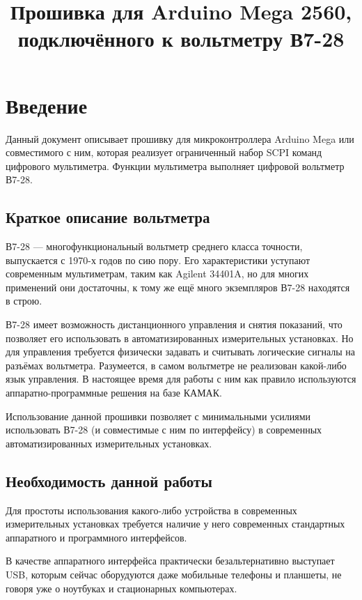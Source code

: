 \documentclass[12pt, a4paper]{article}
\title{Прошивка для Arduino Mega 2560, подключённого к вольтметру В7-28}
\newcommand{\SCPI}{\mbox{SCPI}}
\newcommand{\V}{\mbox{В7-28}}
\newcommand{\Arduino}{Arduino Mega}
\begin{document}
\maketitle

\section{Введение}

Данный документ описывает прошивку для микроконтроллера \Arduino{} или совместимого с ним, которая реализует ограниченный набор \SCPI{} команд цифрового мультиметра. Функции мультиметра выполняет цифровой вольтметр \V.

\subsection{Краткое описание вольтметра}

\V{} --- многофункциональный вольтметр среднего класса точности, выпускается с 1970-х годов по сию пору. Его характеристики уступают современным мультиметрам, таким как Agilent \mbox{34401A}, но для многих применений они достаточны, к тому же ещё много экземпляров \V{} находятся в строю.

\V{} имеет возможность дистанционного управления и снятия показаний, что позволяет его использовать в автоматизированных измерительных установках. Но для управления требуется физически задавать и считывать логические сигналы на разъёмах вольтметра. Разумеется, в самом вольтметре не реализован какой-либо язык управления. В настоящее время для работы с ним как правило используются аппаратно-программные решения на базе КАМАК.

Использование данной прошивки позволяет с минимальными усилиями использовать \V{} (и совместимые с ним по интерфейсу) в современных автоматизированных измерительных установках.

\subsection{Необходимость данной работы}

Для простоты использования какого-либо устройства в современных измерительных установках требуется наличие у него современных стандартных аппаратного и программного интерфейсов.

В качестве аппаратного интерфейса практически безальтернативно выступает USB, которым сейчас оборудуются даже мобильные телефоны и планшеты, не говоря уже о ноутбуках и стационарных компьютерах.
\end{document}
